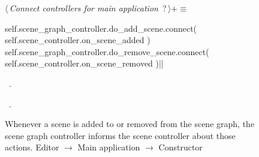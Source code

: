 \documentclass[%
    a4paper,    %
    justified,  %
    nobib,      %
    openany     %
]{tufte-book}
\begin{document}
\begin{figure}
\begin{flushleft} \small
\begin{minipage}{\linewidth}\label{scrap86}\raggedright\small
{} $\langle\,${\itshape Connect controllers for main application}\nobreak\ {\footnotesize {?}}$\,\rangle+\equiv$
\vspace{-1ex}
\begin{pythoncode}
self.scene_graph_controller.do_add_scene.connect(
    self.scene_controller.on_scene_added
)
self.scene_graph_controller.do_remove_scene.connect(
    self.scene_controller.on_scene_removed
)|\NWsep|
\end{pythoncode}
\vspace{1.5ex}
\footnotesize
\begin{list}{}{\setlength{\itemsep}{-\parsep}\setlength{\itemindent}{-\leftmargin}}
\item \NWtxtMacroDefBy\ .
\item \NWtxtMacroRefIn\ .

\item{}
\end{list}
\end{minipage}\vspace{4ex}
\end{flushleft}
\caption{Whenever a scene is added to or removed from the scene graph, the scene graph
  controller informs the scene controller about those actions.
  \newline{}\newline{}Editor $\rightarrow$ Main application $\rightarrow$
  Constructor}
\label{editor:lst:main-application:constructor:connect-scene-controllers-add-remove}
\end{figure}

\end{document}
